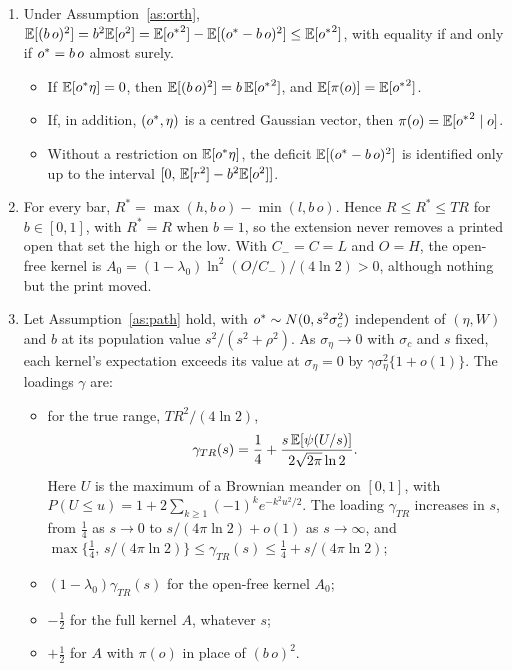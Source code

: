 \begin{proposition}\label{prop:kernel}
\leavevmode
\begin{enumerate}[label=(\alph*)]
  \item Under Assumption~\ref{as:orth},
        $\mathbb{E}[(b\,o)^2]=b^2\mathbb{E}[o^2]=\mathbb{E}[{o^{*}}^2]-\mathbb{E}[({o^{*}}-b\,o)^2]\le\mathbb{E}[{o^{*}}^2]$, with equality if and only
        if ${o^{*}}=b\,o$ almost surely.
        \begin{itemize}
          \item If $\mathbb{E}[{o^{*}}\eta]=0$, then $\mathbb{E}[(b\,o)^2]=b\,\mathbb{E}[{o^{*}}^2]$, and $\mathbb{E}[\pi(o)]=\mathbb{E}[{o^{*}}^2]$.
          \item If, in addition, $({o^{*}},\eta)$ is a centred Gaussian vector, then
                $\pi(o)=\mathbb{E}[{o^{*}}^2\mid o]$.
          \item Without a restriction on $\mathbb{E}[{o^{*}}\eta]$, the deficit $\mathbb{E}[({o^{*}}-b\,o)^2]$ is identified
                only up to the interval $[0,\,\mathbb{E}[r^2]-b^2\mathbb{E}[o^2]]$.
        \end{itemize}
  \item For every bar, $R^*=\max(h,b\,o)-\min(l,b\,o)$. Hence $R\le R^*\le TR$ for $b\in[0,1]$,
        with $R^*=R$ when $b=1$, so the extension never removes a printed open that set the high or
        the low. With $C_{-}=C=L$ and $O=H$, the open-free kernel is
        $A_0=(1-\lambda_0)\ln^2(O/C_{-})/(4\ln2)>0$, although nothing but the print moved.
  \item Let Assumption~\ref{as:path} hold, with ${o^{*}}\sim N(0,s^2\sigma_c^2)$ independent of
        $(\eta,W)$ and $b$ at its population value $s^2/(s^2+\rho^2)$. As $\sigma_\eta\to0$ with
        $\sigma_c$ and $s$ fixed, each kernel's expectation exceeds its value at $\sigma_\eta=0$ by
        $\gamma\sigma_\eta^2\{1+o(1)\}$. The loadings $\gamma$ are:
        \begin{itemize}
          \item for the true range, $TR^2/(4\ln2)$,
                \begin{equation}\label{eq:gammaTR}
                  \gamma_{TR}(s)=\frac14+\frac{s\,\mathbb{E}[\psi(U/s)]}{2\sqrt{2\pi}\ln2}.
                \end{equation}
                Here $U$ is the maximum of a Brownian meander on $[0,1]$, with
                $P(U\le u)=1+2\sum_{k\ge1}(-1)^ke^{-k^2u^2/2}$. The loading $\gamma_{TR}$ increases
                in $s$, from $\tfrac14$ as $s\to0$ to $s/(4\pi\ln2)+o(1)$ as $s\to\infty$, and
                $\max\{\tfrac14,\,s/(4\pi\ln2)\}\le\gamma_{TR}(s)\le\tfrac14+s/(4\pi\ln2)$;
          \item $(1-\lambda_0)\gamma_{TR}(s)$ for the open-free kernel $A_0$;
          \item $-\tfrac12$ for the full kernel $A$, whatever $s$;
          \item $+\tfrac12$ for $A$ with $\pi(o)$ in place of $(b\,o)^2$.
        \end{itemize}
\end{enumerate}
\end{proposition}

